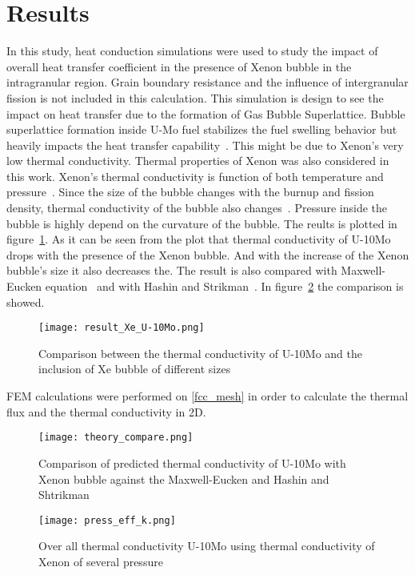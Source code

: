 \section{Results}
\begin{doublespacing}
In this study, heat conduction simulations were used to study the impact of overall heat transfer coefficient in the presence of Xenon bubble in the intragranular region. Grain boundary resistance and the influence of intergranular fission is not included in this calculation. This simulation is design to see the impact on heat transfer due to the formation of Gas Bubble Superlattice. Bubble superlattice formation inside U-Mo fuel stabilizes the fuel swelling behavior but heavily impacts the heat transfer capability~\cite{burkes2015thermal}. This might be due to Xenon's very low thermal conductivity. Thermal properties of Xenon was also considered in this work. Xenon's thermal conductivity is function of both temperature and pressure~\cite{rabinovich1987thermophysical}. Since the size of the bubble changes with the burnup and fission density, thermal conductivity of the bubble also changes~\cite{miller2012advantages}. Pressure inside the bubble is highly depend on the curvature of the bubble. The reults is plotted in figure~\ref{fig_result}. As it can be seen from the plot that thermal conductivity of U-10Mo drops with the presence of the Xenon bubble. And with the increase of the Xenon bubble's size it also decreases the. The result is also compared with Maxwell-Eucken equation~\cite{maxwell1881treatise} and with Hashin and Strikman~\cite{hashin1962variational}. In figure~\ref{fig_compare} the comparison is showed. 

\begin{figure}[H]
\centering
\texttt{[image: result\_Xe\_U-10Mo.png]}
\caption{Comparison between the thermal conductivity of U-10Mo and the inclusion of Xe bubble of different sizes}
\label{fig_result}
\end{figure}

FEM calculations were performed on \ref{fcc_mesh} in order to calculate the thermal flux and the thermal conductivity in 2D. 


\begin{figure}[H]
	\centering
	\texttt{[image: theory\_compare.png]}
	\caption{Comparison of predicted thermal conductivity of U-10Mo with Xenon bubble against the Maxwell-Eucken and Hashin and Shtrikman }
	\label{fig_compare}
	\end{figure}


\begin{figure}[H]
	\centering
	\texttt{[image: press\_eff\_k.png]}
	\caption{Over all thermal conductivity U-10Mo using thermal conductivity of Xenon of several pressure}
	\label{fig_press_K}
	
\end{figure}




\end{doublespacing}
